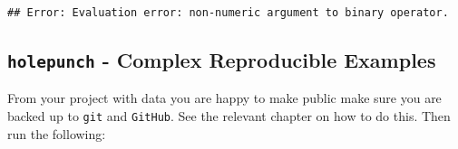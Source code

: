 \documentclass[]{book}
\newenvironment{Shaded}{\begin{snugshade}}{\end{snugshade}}
\newcommand{\CommentTok}[1]{\textcolor[rgb]{0.56,0.35,0.01}{\textit{#1}}}
\newcommand{\DataTypeTok}[1]{\textcolor[rgb]{0.13,0.29,0.53}{#1}}
\newcommand{\DecValTok}[1]{\textcolor[rgb]{0.00,0.00,0.81}{#1}}
\newcommand{\KeywordTok}[1]{\textcolor[rgb]{0.13,0.29,0.53}{\textbf{#1}}}
\newcommand{\NormalTok}[1]{#1}
\newcommand{\OperatorTok}[1]{\textcolor[rgb]{0.81,0.36,0.00}{\textbf{#1}}}
\newcommand{\OtherTok}[1]{\textcolor[rgb]{0.56,0.35,0.01}{#1}}
\newcommand{\StringTok}[1]{\textcolor[rgb]{0.31,0.60,0.02}{#1}}
\theoremstyle{definition}
\theoremstyle{definition}
\theoremstyle{definition}
\theoremstyle{remark}
\begin{document}
\begin{Shaded}
\end{Shaded}

\begin{verbatim}
## Error: Evaluation error: non-numeric argument to binary operator.
\end{verbatim}

\hypertarget{holepunch---complex-reproducible-examples}{%
\subsection{\texorpdfstring{\texttt{holepunch} - Complex Reproducible
Examples}{holepunch - Complex Reproducible Examples}}\label{holepunch---complex-reproducible-examples}}

From your project with data you are happy to make public make sure you
are backed up to \texttt{git} and \texttt{GitHub}. See the relevant
chapter on how to do this. Then run the following:
\end{document}
